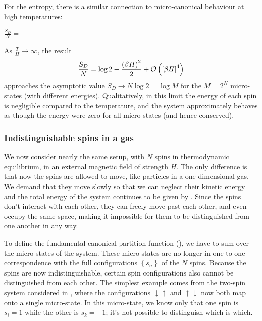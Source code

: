 For the entropy, there is a similar connection to micro-canonical behaviour at high temperatures:
\begin{mdframed}
  $\displaystyle \frac{S_D}{N} = $ \\[100 pt]
\end{mdframed}
As $\frac{T}{H} \to \infty$, the result
\begin{equation*}
  \frac{S_D}{N} = \log 2 - \frac{\left(\beta H\right)^2}{2} + \mathcal O\left(\left[\beta H\right]^4\right)
\end{equation*}
approaches the asymptotic value $S_D \to N\log 2 = \log M$ for the $M = 2^N$ micro-states (with different energies).
Qualitatively, in this limit the energy of each spin is negligible compared to the temperature, and the system approximately behaves as though the energy were zero for all micro-states (and hence conserved).



\subsubsection{Indistinguishable spins in a gas}
We now consider nearly the same setup, with $N$ spins in thermodynamic equilibrium, in an external magnetic field of strength $H$.
The only difference is that now the spins are allowed to move, like particles in a one-dimensional gas.
We demand that they move slowly so that we can neglect their kinetic energy and the total energy of the system continues to be given by .
Since the spins don't interact with each other, they can freely move past each other, and even occupy the same space, making it impossible for them to be distinguished from one another in any way. %

To define the fundamental canonical partition function (), we have to sum over the micro-states of the system.
These micro-states are no longer in one-to-one correspondence with the full configurations $\left\{s_n\right\}$ of the $N$ spins.
Because the spins are now indistinguishable, certain spin configurations also cannot be distinguished from each other.
The simplest example comes from the two-spin system considered in , where the configurations $\downarrow\uparrow$ and $\uparrow\downarrow$ now both map onto a single micro-state.
In this micro-state, we know only that one spin is $s_i = 1$ while the other is $s_k = -1$; it's not possible to distinguish which is which.

